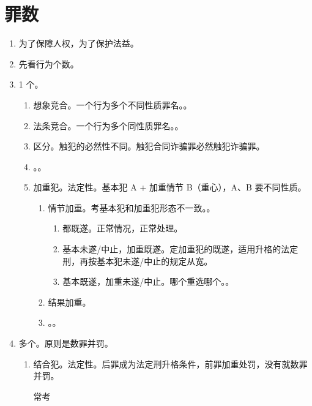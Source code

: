 \section{罪数}
\begin{enumerate}
  \item 为了保障人权，为了保护法益。
  \item 先看行为个数。
  \item 1 个。
        \begin{enumerate}
          \item 想象竞合。一个行为多个不同性质罪名。。
          \item 法条竞合。一个行为多个同性质罪名。。
          \item \sjt 区分。触犯的必然性不同。触犯合同诈骗罪必然触犯诈骗罪。
          \item {}。。
          \item 加重犯。法定性。基本犯 A + 加重情节 B（重心），A、B 要不同性质。
                \begin{enumerate}
                  \item 情节加重。考基本犯和加重犯形态不一致。。
                        \begin{enumerate}
                          \item 都既遂。正常情况，正常处理。
                          \item 基本未遂/中止，加重既遂。定加重犯的既遂，适用升格的法定刑，再按基本犯未遂/中止的规定从宽。
                          \item 基本既遂，加重未遂/中止。哪个重选哪个。。
                        \end{enumerate}
                  \item 结果加重。
                  \item {}。。
                \end{enumerate}
        \end{enumerate}
  \item 多个。原则是数罪并罚。
        \begin{enumerate}
          \item 结合犯。法定性。后罪成为法定刑升格条件，前罪加重处罚，没有就数罪并罚。
                \begin{kk}{常考}

\end{kk}
\end{enumerate}
\end{enumerate}
